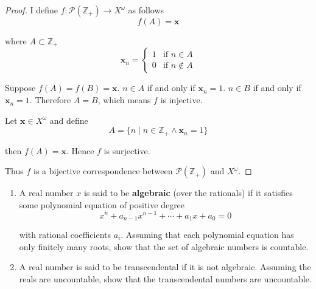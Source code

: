 \begin{proof}
    I define $f: \mathscr{P}(\mathbb{Z}_{+})\to X^{\omega}$ as follows
    \[
        f(A) = \mathbf{x}
    \]

    where $A\subset\mathbb{Z}_{+}$
    \[
        \mathbf{x}_{n} = \begin{cases}
            1 & \text{if $n\in A$}    \\
            0 & \text{if $n\notin A$}
        \end{cases}
    \]

    Suppose $f(A) = f(B) = \mathbf{x}$. $n\in A$ if and only if $\mathbf{x}_{n} = 1$. $n\in B$ if and only if $\mathbf{x}_{n} = 1$. Therefore $A = B$, which means $f$ is injective.

    Let $\mathbf{x}\in X^{\omega}$ and define
    \[
        A = \{ n \mid n\in\mathbb{Z}_{+} \land \mathbf{x}_{n} = 1 \}
    \]

    then $f(A) = \mathbf{x}$. Hence $f$ is surjective.

    Thus $f$ is a bijective correspondence between $\mathscr{P}(\mathbb{Z}_{+})$ and $X^{\omega}$.
\end{proof}

\begin{exercise}\label{chapter1:section7:exercise4}
    \begin{enumerate}[label={(\alph*)}]
        \item A real number $x$ is said to be \textbf{algebraic} (over the rationals) if it satisfies some polynomial equation of positive degree
              \[
                  x^{n} + a_{n-1}x^{n-1} + \cdots + a_{1}x + a_{0} = 0
              \]

              with rational coefficients $a_{i}$. Assuming that each polynomial equation has only finitely many roots, show that the set of algebraic numbers is countable.
        \item A real number is said to be transcendental if it is not algebraic. Assuming the reals are uncountable, show that the transcendental numbers are uncountable.
    \end{enumerate}
\end{exercise}

